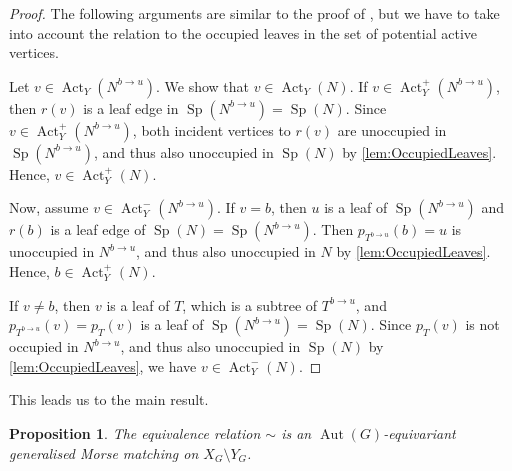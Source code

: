 \documentclass[reqno,dvipsnames]{amsart}
\theoremstyle{plain}
\newtheorem{proposition}[theorem]{Proposition}
\numberwithin{equation}{section}
\theoremstyle{definition}
\DeclareMathOperator{\Act}{Act}
\DeclareMathOperator{\Sp}{Sp}
\DeclareMathOperator{\Aut}{Aut}
\begin{document}
\begin{proof}
	The following arguments are similar to the proof of \cite[Lemma 4.20]{Kozlov25}, but we have to take into account the relation to the occupied leaves in the set of potential active vertices.
	
	Let $v\in \Act_Y(N^{b\to u})$. We show that $v\in \Act_Y(N)$. If $v\in \Act_Y^+(N^{b\to u})$, then $r(v)$ is a leaf edge in $\Sp(N^{b\to u}) = \Sp(N)$. Since $v\in \Act_Y^+(N^{b\to u})$, both incident vertices to $r(v)$ are unoccupied in $\Sp(N^{b\to u})$, and thus also unoccupied in $\Sp(N)$ by \autoref{lem:OccupiedLeaves}. Hence, $v\in \Act_Y^+(N)$.
	
	Now, assume $v\in \Act_Y^-(N^{b\to u})$. If $v=b$, then $u$ is a leaf of $\Sp(N^{b\to u})$ and $r(b)$ is a leaf edge of $\Sp(N)=\Sp(N^{b\to u})$. Then $p_{T^{b\to u}}(b)=u$ is unoccupied in $N^{b\to u}$, and thus also unoccupied in $N$ by \autoref{lem:OccupiedLeaves}. Hence, $b\in \Act_Y^+(N)$.
	
	If $v\neq b$, then $v$ is a leaf of $T$, which is a subtree of $T^{b\to u}$, and $p_{T^{b\to u}}(v) = p_T(v)$ is a leaf of $\Sp(N^{b\to u}) = \Sp(N)$. Since $p_T(v)$ is not occupied in $N^{b\to u}$, and thus also unoccupied in $\Sp(N)$ by \autoref{lem:OccupiedLeaves}, we have $v\in \Act_Y^-(N)$.
\end{proof}

This leads us to the main result.

\begin{proposition}\label{equivMatchingProp}
	The equivalence relation $\sim$ is an $\Aut(G)$-equivariant generalised Morse matching on $X_G\setminus Y_G$.
\end{proposition}
\end{document}
